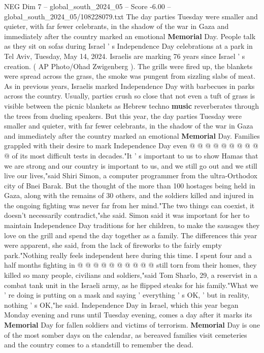 \begin{textsample}{NEG Dim 7 – global\_south\_2024\_05 – Score -6.00 – global\_south\_2024\_05/108228079.txt}  \label{ex:f7_neg_386}
The day parties Tuesday were smaller and quieter, with far fewer celebrants, in the shadow of the war in Gaza and immediately after the country marked an emotional \textbf{Memorial} Day.
People talk as they sit on sofas during Israel ' s Independence Day celebrations at a park in Tel Aviv, Tuesday, May 14, 2024.
Israelis are marking 76 years since Israel ' s creation. ( AP Photo/Ohad Zwigenberg ).
The grills were fired up, the blankets were spread across the grass, the smoke was pungent from sizzling slabs of meat.
As in previous years, Israelis marked Independence Day with barbecues in parks across the country.
Usually, parties crush so close that not even a tuft of grass is visible between the picnic blankets as Hebrew techno \textbf{music} reverberates through the trees from dueling speakers.
But this year, the day parties Tuesday were smaller and quieter, with far fewer celebrants, in the shadow of the war in Gaza and immediately after the country marked an emotional \textbf{Memorial} Day.
Families grappled with their desire to mark Independence Day even @ @ @ @ @ @ @ @ @ @ of its most difficult tests in decades."It ' s important to us to show Hamas that we are strong and our country is important to us, and we still go out and we still live our lives,"said Shiri Simon, a computer programmer from the ultra-Orthodox city of Bnei Barak.
But the thought of the more than 100 hostages being held in Gaza, along with the remains of 30 others, and the soldiers killed and injured in the ongoing fighting was never far from her mind."The two things can coexist, it doesn't necessarily contradict,"she said.
Simon said it was important for her to maintain Independence Day traditions for her children, to make the sausages they love on the grill and spend the day together as a family.
The differences this year were apparent, she said, from the lack of fireworks to the fairly empty park."Nothing really feels independent here during this time.
I spent four and a half months fighting in @ @ @ @ @ @ @ @ @ @ still torn from their homes, they killed so many people, civilians and soldiers,"said Tom Sharlo, 29, a reservist in a combat tank unit in the Israeli army, as he flipped steaks for his family."What we ' re doing is putting on a mask and saying ' everything ' s OK, ' but in reality, nothing ' s OK,"he said.
Independence Day in Israel, which this year began Monday evening and runs until Tuesday evening, comes a day after it marks its \textbf{Memorial} Day for fallen soldiers and victims of terrorism. \textbf{Memorial} Day is one of the most somber days on the calendar, as bereaved families visit cemeteries and the country comes to a standstill to remember the dead.

\end{textsample}

